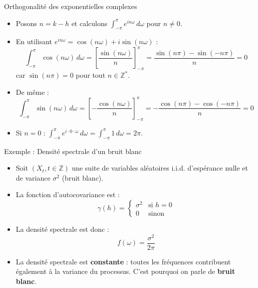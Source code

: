 \documentclass[11pt,aspectratio=169]{beamer}
\newcommand{\Z}{\mathbb{Z}}
\begin{document}
\begin{frame}{Orthogonalité des exponentielles complexes}

\begin{itemize}

\item Posons $n = k - h$ et calculons $\int_{-\pi}^{\pi} e^{in\omega} \, d\omega$ pour $n \neq 0$.\newline

\item En utilisant $e^{in\omega} = \cos(n\omega) + i\sin(n\omega)$ :
  \[
  \int_{-\pi}^{\pi} \cos(n\omega) \, d\omega = \left[ \frac{\sin(n\omega)}{n} \right]_{-\pi}^{\pi} = \frac{\sin(n\pi) - \sin(-n\pi)}{n} = 0
  \]
  car $\sin(n\pi) = 0$ pour tout $n \in \Z^*$.\newline

\item De même :
  \[
  \int_{-\pi}^{\pi} \sin(n\omega) \, d\omega = \left[ -\frac{\cos(n\omega)}{n} \right]_{-\pi}^{\pi} = -\frac{\cos(n\pi) - \cos(-n\pi)}{n} = 0
  \]\newline

\item Si $n = 0$ : $\int_{-\pi}^{\pi} e^{i \cdot 0 \cdot \omega} \, d\omega = \int_{-\pi}^{\pi} 1 \, d\omega = 2\pi$.

\end{itemize}

\end{frame}

\begin{frame}{Exemple : Densité spectrale d'un bruit blanc}

\begin{itemize}

\item Soit $(X_t, t \in \Z)$ une suite de variables aléatoires i.i.d. d'espérance nulle et de variance $\sigma^2$ (bruit blanc).\newline

\item La fonction d'autocovariance est :
  \[
  \gamma(h) = \begin{cases}
  \sigma^2 & \text{si } h = 0 \\
  0 & \text{sinon}
  \end{cases}
  \]\newline

\item La densité spectrale est donc :
  \[
  f(\omega) = \frac{\sigma^2}{2\pi}
  \]\newline

\item La densité spectrale est \textbf{constante} : toutes les fréquences contribuent également à la variance du processus. C'est pourquoi on parle de \textbf{bruit blanc}.

\end{itemize}

\end{frame}
\end{document}

